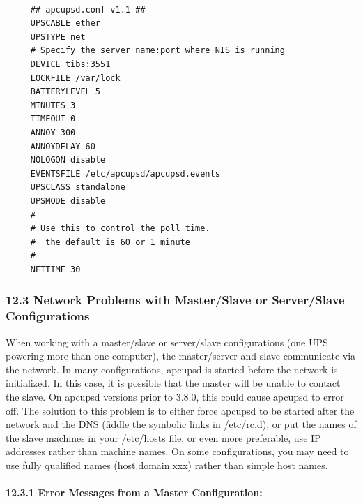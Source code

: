 \footnotesize
\begin{verbatim}
     
     ## apcupsd.conf v1.1 ##
     UPSCABLE ether
     UPSTYPE net
     # Specify the server name:port where NIS is running
     DEVICE tibs:3551
     LOCKFILE /var/lock
     BATTERYLEVEL 5
     MINUTES 3
     TIMEOUT 0
     ANNOY 300
     ANNOYDELAY 60
     NOLOGON disable
     EVENTSFILE /etc/apcupsd/apcupsd.events
     UPSCLASS standalone
     UPSMODE disable
     #
     # Use this to control the poll time.
     #  the default is 60 or 1 minute
     #
     NETTIME 30
\end{verbatim}
\normalsize

\label{Network-Problems-with-Master_002fSlave-or-Server_002fSlave-Configuratio%
ns}

\subsubsection*{12.3 Network Problems with Master/Slave or Server/Slave
Configurations}

\label{index-Problems_002c-Master_002fSlave-159}
\label{index-Problems_002c-networking-160}
When working with a master/slave or server/slave configurations (one UPS
powering more than one computer), the master/server and slave communicate via
the network. In many configurations, apcupsd is started before the network is
initialized. In this case, it is possible that the master will be unable to
contact the slave. On apcupsd versions prior to 3.8.0, this could cause
apcupsd to error off. The solution to this problem is to either force apcupsd
to be started after the network and the DNS (fiddle the symbolic links in
/etc/rc.d), or put the names of the slave machines in your /etc/hosts file, or
even more preferable, use IP addresses rather than machine names. On some
configurations, you may need to use fully qualified names (host.domain.xxx)
rather than simple host names. 

\label{Error-Messages-from-a-Master-Configuration}

\paragraph*{12.3.1 Error Messages from a Master Configuration:}


